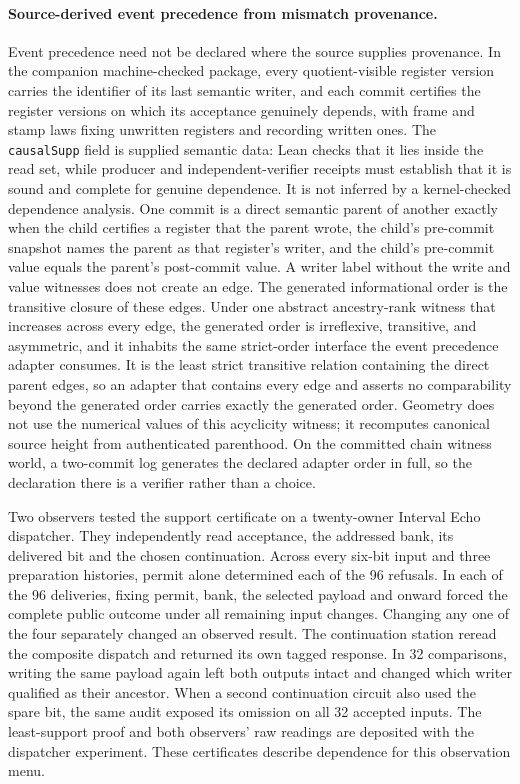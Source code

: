 \documentclass[11pt]{article}
\theoremstyle{remark}
\theoremstyle{plain}
\begin{document}
\paragraph{Source-derived event precedence from mismatch provenance.}
Event precedence need not be declared where the source supplies
provenance.  In the companion machine-checked package, every
quotient-visible register version carries the identifier of its last
semantic writer, and each commit certifies the register versions on which
its acceptance genuinely depends, with frame and stamp laws fixing
unwritten registers and recording written ones. The \texttt{causalSupp}
field is supplied semantic data: Lean checks that it lies inside the read
set, while producer and independent-verifier receipts must establish that it
is sound and complete for genuine dependence. It is not inferred by a
kernel-checked dependence analysis. One commit is a direct
semantic parent of another exactly when the child certifies a register that
the parent wrote, the child's pre-commit snapshot names the parent as that
register's writer, and the child's pre-commit value equals the parent's
post-commit value. A writer label without the write and value witnesses does
not create an edge.
The generated informational order is the transitive closure of these edges.
Under one abstract ancestry-rank witness that increases across every edge, the generated order is
irreflexive, transitive, and asymmetric, and it inhabits the same
strict-order interface the event precedence adapter consumes.  It is the
least strict transitive relation containing the direct parent edges, so
an adapter that contains every edge and asserts no comparability beyond
the generated order carries exactly the generated order. Geometry does not
use the numerical values of this acyclicity witness; it recomputes canonical
source height from authenticated parenthood. On the
committed chain witness world, a two-commit log generates the declared
adapter order in full, so the declaration there is a verifier rather than
a choice.

Two observers tested the support certificate on a twenty-owner Interval Echo
dispatcher. They independently read acceptance, the addressed bank, its
delivered bit and the chosen continuation. Across every six-bit input and
three preparation histories, permit alone determined each of the 96
refusals. In each of the 96 deliveries, fixing permit, bank, the selected
payload and onward forced the complete public outcome under all remaining
input changes. Changing any one of the four separately changed an observed
result. The continuation station reread the composite dispatch and returned
its own tagged response. In 32 comparisons, writing the same payload again
left both outputs intact and changed which writer qualified as their
ancestor. When a second continuation circuit also used the spare bit, the
same audit exposed its omission on all 32 accepted inputs. The least-support
proof and both observers' raw readings are deposited with the dispatcher
experiment. These certificates describe dependence for this observation menu.
\end{document}
